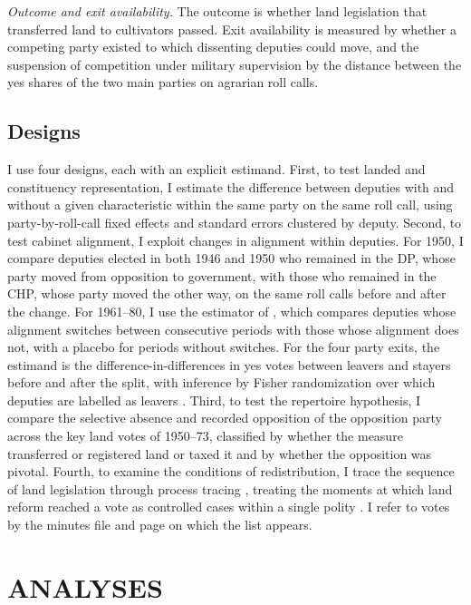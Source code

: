 \documentclass[12pt]{article}
\begin{document}
\textit{Outcome and exit availability.} The outcome is whether land legislation that transferred land to cultivators passed. Exit availability is measured by whether a competing party existed to which dissenting deputies could move, and the suspension of competition under military supervision by the distance between the yes shares of the two main parties on agrarian roll calls.

\subsection*{Designs}

I use four designs, each with an explicit estimand. First, to test landed and constituency representation, I estimate the difference between deputies with and without a given characteristic within the same party on the same roll call, using party-by-roll-call fixed effects and standard errors clustered by deputy. Second, to test cabinet alignment, I exploit changes in alignment within deputies. For 1950, I compare deputies elected in both 1946 and 1950 who remained in the DP, whose party moved from opposition to government, with those who remained in the CHP, whose party moved the other way, on the same roll calls before and after the change. For 1961--80, I use the estimator of \citet{dechaisemartin2020}, which compares deputies whose alignment switches between consecutive periods with those whose alignment does not, with a placebo for periods without switches. For the four party exits, the estimand is the difference-in-differences in yes votes between leavers and stayers before and after the split, with inference by Fisher randomization over which deputies are labelled as leavers \citep{imbens2015}. Third, to test the repertoire hypothesis, I compare the selective absence and recorded opposition of the opposition party across the key land votes of 1950--73, classified by whether the measure transferred or registered land or taxed it and by whether the opposition was pivotal. Fourth, to examine the conditions of redistribution, I trace the sequence of land legislation through process tracing \citep{collier2011}, treating the moments at which land reform reached a vote as controlled cases within a single polity \citep{slater2013}. I refer to votes by the minutes file and page on which the list appears.

\section*{ANALYSES}
\end{document}

